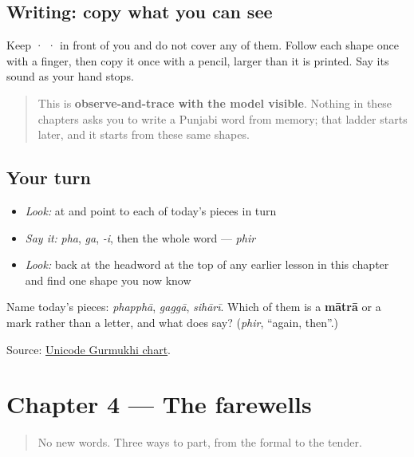 \subsection*{Writing: copy what you can see}
Keep  ·  ·  in front of you and do not cover any of them. Follow each shape once with a finger, then copy it once with a pencil, larger than it is printed. Say its sound as your hand stops.

\begin{quote}
This is \textbf{observe-and-trace with the model visible}. Nothing in these chapters asks you to write a Punjabi word from memory; that ladder starts later, and it starts from these same shapes.
\end{quote}

\subsection*{Your turn}
\begin{itemize}
\raggedright
  \item \emph{Look:} at \textbf{} and point to each of today's pieces in turn
  \item \emph{Say it:} \emph{pha}, \emph{ga}, \emph{-i}, then the whole word — \emph{phir}
  \item \emph{Look:} back at the headword at the top of any earlier lesson in this chapter and find one shape you now know
\end{itemize}

\begin{tcolorbox}[breakable,colback=teal!4,colframe=teal!35!black,title={Before you move on}]
Name today's pieces: \emph{phapphā}, \emph{gaggā}, \emph{sihārī}. Which of them is a \textbf{mātrā} or a mark rather than a letter, and what does \textbf{} say? (\emph{phir}, “again, then”.)

Source: \href{https://www.unicode.org/charts/PDF/U0A00.pdf}{Unicode Gurmukhi chart}.
\end{tcolorbox}
\section[Practice]{Chapter 4 — The farewells}

\label{lesson:PA-C04-practice}



\begin{quote}
No new words. Three ways to part, from the formal to the tender.
\end{quote}

